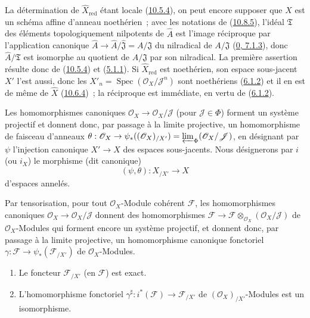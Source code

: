 
La détermination de $\widehat X_{\mathrm{red}}$ étant locale
(\hyperref[I.10.5.4-fr]{10.5.4}), on peut encore supposer que $X$ est un
schéma affine d'anneau noethérien~; avec les notations de
(\hyperref[I.10.8.5-fr]{10.8.5}), l'idéal $\mathfrak{T}$ des éléments
topologiquement nilpotents de $\widehat A$ est l'image réciproque par
l'application canonique
$\widehat A\to\widehat A/\widehat{\mathfrak{J}}=A/\mathfrak{J}$ du
nilradical de $A/\mathfrak{J}$
(\hyperref[0.7.1.3-fr]{0, 7.1.3}), donc $\widehat A/\mathfrak{T}$ est
isomorphe au quotient de $A/\mathfrak{J}$ par son nilradical. La première
assertion résulte donc de (\hyperref[I.10.5.4-fr]{10.5.4}) et
(\hyperref[I.5.1.1-fr]{5.1.1}). Si $\widehat X_{\mathrm{red}}$ est
noethérien, son espace sous-jacent $X'$ l'est aussi, donc les
$X'_n=\operatorname{Spec}(\mathscr{O}_X/\mathscr{J}^n)$ sont noethériens
(\hyperref[I.6.1.2-fr]{6.1.2}) et il en est de même de $\widehat X$
(\hyperref[I.10.6.4-fr]{10.6.4})~; la réciproque est immédiate, en vertu
de (\hyperref[I.6.1.2-fr]{6.1.2}).

\begin{env}[10.8.7]
\label{I.10.8.7-fr}
Les homomorphismes canoniques
$\mathscr{O}_X\to\mathscr{O}_X/\mathscr{J}$ (pour
$\mathscr{J}\in\Phi$) forment un système projectif et donnent donc, par
passage à la limite projective, un homomorphisme de faisceau d'anneaux
$\theta:\mathscr{O}_X\to\psi_*((\mathscr{O}_X)_{/X'})
=\varprojlim_\Phi(\mathscr{O}_X/\mathscr{J})$, en désignant par $\psi$
l'injection canonique $X'\to X$ des espaces sous-jacents. Nous désignerons
par $i$ (ou $i_X$) le morphisme (dit canonique)
\[
  (\psi,\theta):X_{/X'}\to X
\]
d'espaces annelés.

Par tensorisation, pour tout $\mathscr{O}_X$-Module cohérent
$\mathscr{F}$, les homomorphismes canoniques
$\mathscr{O}_X\to\mathscr{O}_X/\mathscr{J}$ donnent des homomorphismes
$\mathscr{F}\to
\mathscr{F}\otimes_{\mathscr{O}_X}(\mathscr{O}_X/\mathscr{J})$ de
$\mathscr{O}_X$-Modules qui forment encore un système projectif, et
donnent donc, par passage à la limite projective, un homomorphisme
canonique fonctoriel
$\gamma:\mathscr{F}\to\psi_*(\mathscr{F}_{/X'})$ de
$\mathscr{O}_X$-Modules.
\end{env}

\begin{proposition}[10.8.8]
\label{I.10.8.8-fr}
\medskip\noindent
\begin{enumerate}
  \item[\rm{(i)}] Le foncteur $\mathscr{F}_{/X'}$ (en $\mathscr{F}$) est
    exact.
  \item[\rm{(ii)}] L'homomorphisme fonctoriel
    $\gamma^\sharp:i^*(\mathscr{F})\to\mathscr{F}_{/X'}$ de
    $(\mathscr{O}_X)_{/X'}$-Modules est un isomorphisme.
\end{enumerate}
\end{proposition}

